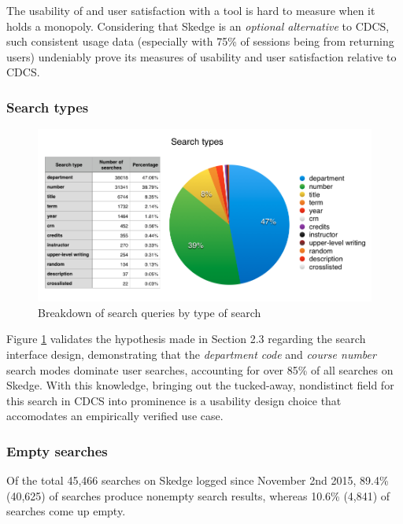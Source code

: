 The usability of and user satisfaction with a tool is hard to measure when it holds a monopoly. Considering that Skedge is an \emph{optional alternative} to CDCS, such consistent usage data (especially with 75\% of sessions being from returning users) undeniably prove its measures of usability and user satisfaction relative to CDCS.

  \subsubsection{Search types}

  \begin{figure}[H]
    \centering
    \includegraphics[width=1.0\textwidth]{images/graph/searchtypes}

    \caption{Breakdown of search queries by type of search}
    \label{fig:searchtypes}
  \end{figure}


Figure \ref{fig:searchtypes} validates the hypothesis made in Section 2.3 regarding the search interface design, demonstrating that the \emph{department code} and \emph{course number} search modes dominate user searches, accounting for over 85\% of all searches on Skedge. With this knowledge, bringing out the tucked-away, nondistinct field for this search in CDCS into prominence is a usability design choice that accomodates an empirically verified use case.

\subsubsection{Empty searches}

  Of the total 45,466 searches on Skedge logged since November 2nd 2015, 89.4\% (40,625) of searches produce nonempty search results, whereas 10.6\% (4,841) of searches come up empty.


